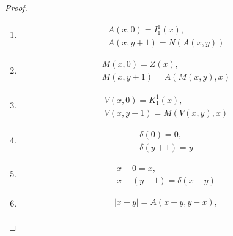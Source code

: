 \documentclass[12pt]{book}
\begin{document}
\begin{proof}
  \begin{enumerate}[(1)]
  \item 
    \begin{gather*}
    A(x,0) = I^1_1(x),\\
    A(x,y+1) = N(A(x,y))
    \end{gather*}
  \item 
    \begin{gather*}
    M(x,0) = Z(x),\\
    M(x,y+1) = A(M(x,y),x)
    \end{gather*}
  \item 
    \begin{gather*}
    V(x,0) = K^1_1(x),\\
    V(x,y+1) = M(V(x,y),x)
    \end{gather*}
  \item 
    \begin{gather*}
    \delta(0) = 0,\\
    \delta(y+1) = y
    \end{gather*}
  \item 
    \begin{gather*}
    x - 0 = x,\\
    x - (y+1) = \delta(x-y)
    \end{gather*}

  \item 
    \begin{gather*}
    |x - y| = A(x-y,y-x),\\
    \end{gather*}


\end{enumerate}
\end{proof}
\end{document}

